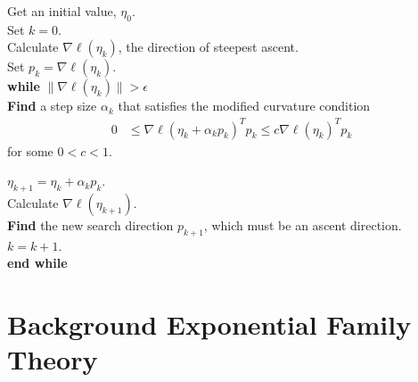 \documentclass[oneside]{myumnStatThesis}
\begin{document}
\noindent Get an initial value, $\eta_0$.\\ 
Set $k=0$. \\
Calculate $\nabla \ell( \eta_k)$, the direction of steepest ascent. \\
Set $p_k = \nabla \ell( \eta_k)$. \\
\textbf{while}  $\lVert \nabla \ell( \eta_k) \rVert > \epsilon$ \\ 
\hspace{4mm} \indent	 \textbf{Find} a step size $\alpha_k$ that satisfies the modified curvature condition
\begin{align*}
	 0 & \leq \nabla \ell( \eta_k + \alpha_k p_k)^T p_k \leq c \nabla \ell(\eta_k)^T p_k
\end{align*}
\indent for some $0 < c < 1$.  


$\eta_{k+1} = \eta_k + \alpha_k p_k$.\\
\indent Calculate $\nabla \ell( \eta_{k+1})$.\\
\indent \textbf{Find} the new search direction $p_{k+1}$, which must be an ascent direction. \\
\indent $k = k + 1$.  \\
\textbf{end while}\\


   


\chapter{Background Exponential Family Theory}\label{Section:Background}
%
\end{document}
